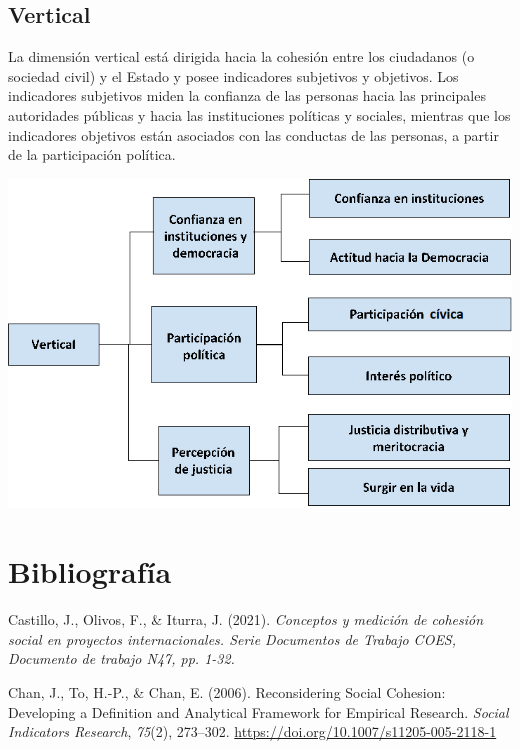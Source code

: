 \documentclass[
  12pt,
]{book}
\begin{document}
\hypertarget{vertical}{%
\section{Vertical}\label{vertical}}

La dimensión vertical está dirigida hacia la cohesión entre los ciudadanos (o sociedad civil) y el Estado y posee indicadores subjetivos y objetivos. Los indicadores subjetivos miden la confianza de las personas hacia las principales autoridades públicas y hacia las instituciones políticas y sociales, mientras que los indicadores objetivos están asociados con las conductas de las personas, a partir de la participación política.

\includegraphics{inputs/images/vertical.png}

\hypertarget{bibliografuxeda}{%
\chapter*{Bibliografía}\label{bibliografuxeda}}

\hypertarget{refs}{}
\leavevmode\hypertarget{ref-castillo_Conceptos_2021}{}%
Castillo, J., Olivos, F., \& Iturra, J. (2021). \emph{Conceptos y medición de cohesión social en proyectos internacionales. Serie Documentos de Trabajo COES, Documento de trabajo N47, pp. 1-32.}

\leavevmode\hypertarget{ref-chan_Reconsidering_2006}{}%
Chan, J., To, H.-P., \& Chan, E. (2006). Reconsidering Social Cohesion: Developing a Definition and Analytical Framework for Empirical Research. \emph{Social Indicators Research}, \emph{75}(2), 273--302. \url{https://doi.org/10.1007/s11205-005-2118-1}
\end{document}
